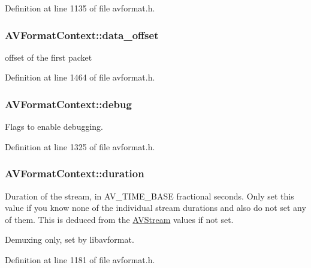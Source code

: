 Definition at line 1135 of file avformat.\+h.

\subsubsection[{\texorpdfstring{data\+\_\+offset}{data_offset}}]{ A\+V\+Format\+Context\+::data\+\_\+offset}\hypertarget{struct_a_v_format_context_ab39a854407abf72836e4653a982d5f2b}{}\label{struct_a_v_format_context_ab39a854407abf72836e4653a982d5f2b}
offset of the first packet 

Definition at line 1464 of file avformat.\+h.

\subsubsection[{\texorpdfstring{debug}{debug}}]{ A\+V\+Format\+Context\+::debug}\hypertarget{struct_a_v_format_context_ab4478e9742f661800cf7e0af84136cae}{}\label{struct_a_v_format_context_ab4478e9742f661800cf7e0af84136cae}
Flags to enable debugging. 

Definition at line 1325 of file avformat.\+h.

\subsubsection[{\texorpdfstring{duration}{duration}}]{ A\+V\+Format\+Context\+::duration}\hypertarget{struct_a_v_format_context_ad0ea78ac48f5bb0a15a15c1c472744d9}{}\label{struct_a_v_format_context_ad0ea78ac48f5bb0a15a15c1c472744d9}
Duration of the stream, in A\+V\+\_\+\+T\+I\+M\+E\+\_\+\+B\+A\+SE fractional seconds. Only set this value if you know none of the individual stream durations and also do not set any of them. This is deduced from the \hyperlink{struct_a_v_stream}{A\+V\+Stream} values if not set.

Demuxing only, set by libavformat. 

Definition at line 1181 of file avformat.\+h.

